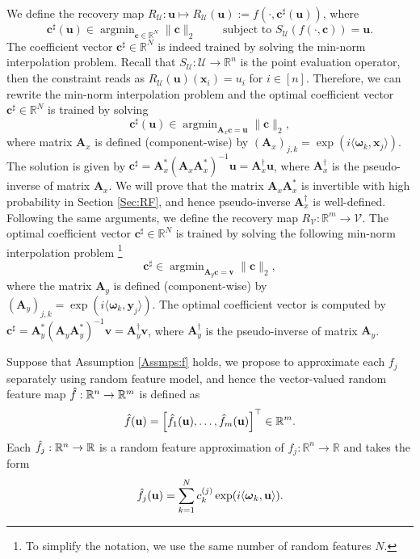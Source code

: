 \documentclass[11pt,twoside]{article}
\theoremstyle{plain}
\theoremstyle{definition}
\theoremstyle{remark}
\newcommand{\R}{\mathbb{R}}
\newcommand{\Ab}{\mathbf{A}}
\newcommand{\xb}{\mathbf{x}}
\newcommand{\yb}{\mathbf{y}}
\newcommand{\cb}{\mathbf{c}}
\newcommand{\ub}{\mathbf{u}}
\newcommand{\vb}{\mathbf{v}}
\newcommand{\Uc}{\mathcal{U}}
\newcommand{\Vc}{\mathcal{V}}
\newcommand{\argmin}{\mathop{\mathrm{argmin}}}
\newcommand{\omegab}{\boldsymbol\omega}
\begin{document}
We define the recovery map $R_\Uc:\ub\mapsto R_\Uc(\ub):=f(\cdot, \cb^\sharp(\ub))$, where
\begin{equation}
\label{opt_Ru}
\cb^\sharp(\ub) \in \argmin_{\cb\in\R^N} \|\cb\|_2 \qquad\mbox{ subject to } S_\Uc(f(\cdot,\cb)) = \ub.
\end{equation}
The coefficient vector $\cb^\sharp\in\R^N$ is indeed trained by solving the min-norm interpolation problem.
Recall that $S_\Uc:\Uc\to\R^n$ is the point evaluation operator, then the constraint reads as $R_\Uc(\ub)(\xb_i) = u_i$ for $i\in[n]$. Therefore, we can rewrite the min-norm interpolation problem and the optimal coefficient vector $\cb^\sharp\in\R^N$ is trained by solving
$$
\cb^\sharp(\ub) \in \argmin_{\Ab_x \cb=\ub} \|\cb\|_2,
$$ 
where matrix $\Ab_x$ is defined (component-wise) by $(\Ab_x)_{j,k} = \exp(i\langle \omegab_k, \xb_j\rangle)$. 
The solution is given by $\cb^\sharp = \Ab_x^*(\Ab_x\Ab_x^*)^{-1}\ub = \Ab_x^\dagger\ub$, where $\Ab_x^\dagger$ is the pseudo-inverse of matrix $\Ab_x$. 
We will prove that the matrix $\Ab_x\Ab_x^*$ is invertible with high probability in Section \ref{Sec:RF}, and hence pseudo-inverse $\Ab_x^\dagger$ is well-defined.
Following the same arguments, we define the recovery map $R_\Vc:\R^m\to\Vc$. The optimal coefficient vector $\cb^\sharp\in\R^N$ is trained by solving the following min-norm interpolation problem \footnote{To simplify the notation, we use the same number of random features $N$.} 
$$
\cb^\sharp \in \argmin_{\Ab_y \cb=\vb} \|\cb\|_2,
$$ 
where the matrix $\Ab_y$ is defined (component-wise) by $(\Ab_y)_{j,k} = \exp(i\langle \omegab_k,\yb_j\rangle)$. 
The optimal coefficient vector is computed by $\cb^\sharp = \Ab_y^*(\Ab_y\Ab_y^*)^{-1}\vb = \Ab_y^\dagger \vb$, where $\Ab_y^\dagger$ is the pseudo-inverse of matrix $\Ab_y$.

Suppose that Assumption \ref{Assmps:f} holds, we propose to approximate each $f_j$ separately using random feature model, and hence the vector-valued random feature map $\Hat{f}:\R^n\to\R^m$ is defined as 
\begin{equation}
\label{operator_rf}
\Hat{f}(\ub) = \left[ \Hat{f}_1(\ub), \dots, \Hat{f}_m(\ub)\right]^\top\in\R^m.
\end{equation}
Each $\Hat{f}_j:\R^n\to\R$ is a random feature approximation of $f_j:\R^n\to\R$ and takes the form
\begin{equation}
\label{hat_f}
\Hat{f}_j(\ub)= \sum_{k=1}^{N} c_k^{(j)} \exp(i\langle \omegab_k,\ub\rangle).
\end{equation}
\end{document}
